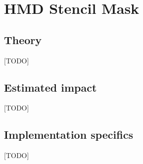 
\section{HMD Stencil Mask}
\subsection{Theory}
[TODO]
\subsection{Estimated impact}
[TODO]
\subsection{Implementation specifics}
[TODO]
